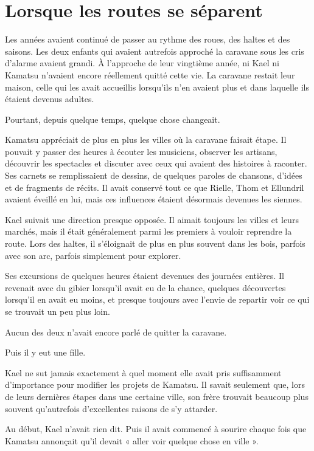 \chapter{Lorsque les routes se séparent}
\label{chap:routes-separent}

Les années avaient continué de passer au rythme des roues, des haltes et des
saisons. Les deux enfants qui avaient autrefois approché la caravane sous les
cris d'alarme avaient grandi. À l'approche de leur vingtième année, ni Kael ni
Kamatsu n'avaient encore réellement quitté cette vie. La caravane restait leur
maison, celle qui les avait accueillis lorsqu'ils n'en avaient plus et dans
laquelle ils étaient devenus adultes.

Pourtant, depuis quelque temps, quelque chose changeait.

Kamatsu appréciait de plus en plus les villes où la caravane faisait étape. Il
pouvait y passer des heures à écouter les musiciens, observer les artisans,
découvrir les spectacles et discuter avec ceux qui avaient des histoires à
raconter. Ses carnets se remplissaient de dessins, de quelques paroles de
chansons, d'idées et de fragments de récits. Il avait conservé tout ce que
Rielle, Thom et Ellundril avaient éveillé en lui, mais ces influences étaient
désormais devenues les siennes.

Kael suivait une direction presque opposée. Il aimait toujours les villes et
leurs marchés, mais il était généralement parmi les premiers à vouloir
reprendre la route. Lors des haltes, il s'éloignait de plus en plus souvent
dans les bois, parfois avec son arc, parfois simplement pour explorer.

Ses excursions de quelques heures étaient devenues des journées entières. Il
revenait avec du gibier lorsqu'il avait eu de la chance, quelques découvertes
lorsqu'il en avait eu moins, et presque toujours avec l'envie de repartir voir
ce qui se trouvait un peu plus loin.

Aucun des deux n'avait encore parlé de quitter la caravane.

Puis il y eut une fille.

Kael ne sut jamais exactement à quel moment elle avait pris suffisamment
d'importance pour modifier les projets de Kamatsu. Il savait seulement que,
lors de leurs dernières étapes dans une certaine ville, son frère trouvait
beaucoup plus souvent qu'autrefois d'excellentes raisons de s'y attarder.

Au début, Kael n'avait rien dit. Puis il avait commencé à sourire chaque fois
que Kamatsu annonçait qu'il devait « aller voir quelque chose en ville ».

